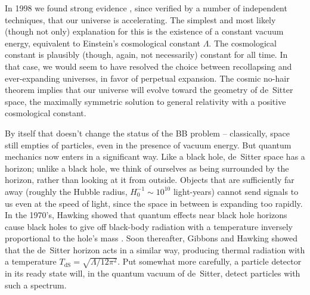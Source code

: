 \documentclass[12pt,letterpaper]{article}
\newcommand{\dS}{{\mathrm{dS}}}
\begin{document}
In 1998 we found strong evidence \cite{Riess:1998cb,Perlmutter:1998np}, since verified by a number of independent techniques, that our universe is accelerating.
The simplest and most likely (though not only) explanation for this is the existence of a constant vacuum energy, equivalent to Einstein's cosmological constant $\Lambda$.
The cosmological constant is plausibly (though, again, not necessarily) constant for all time.
In that case, we would seem to have resolved the choice between recollapsing and ever-expanding universes, in favor of perpetual expansion.
The cosmic no-hair theorem \cite{Wald:1983ky} implies that our universe will evolve toward the geometry of de~Sitter space, the maximally symmetric solution to general relativity with a positive cosmological constant.

By itself that doesn't change the status of the BB problem -- classically, space still empties of particles, even in the presence of vacuum energy.
But quantum mechanics now enters in a significant way.
Like a black hole, de~Sitter space has a horizon; unlike a black hole, we think of ourselves as being surrounded by the horizon, rather than looking at it from outside.
Objects that are sufficiently far away (roughly the Hubble radius, $H_0^{-1} \sim 10^{10}$ light-years) cannot send signals to us even at the speed of light, since the space in between is expanding too rapidly.
In the 1970's, Hawking showed that quantum effects near black hole horizons cause black holes to give off black-body radiation with a temperature inversely proportional to the hole's mass \cite{Hawking:1976de}.
Soon thereafter, Gibbons and Hawking \cite{Gibbons:1977mu} showed that the de~Sitter horizon acts in a similar way, producing thermal radiation with a temperature $T_\dS = \sqrt{\Lambda/12\pi^2}$.
Put somewhat more carefully, a particle detector in its ready state will, in the quantum vacuum of de~Sitter, detect particles with such a spectrum.
\end{document}
